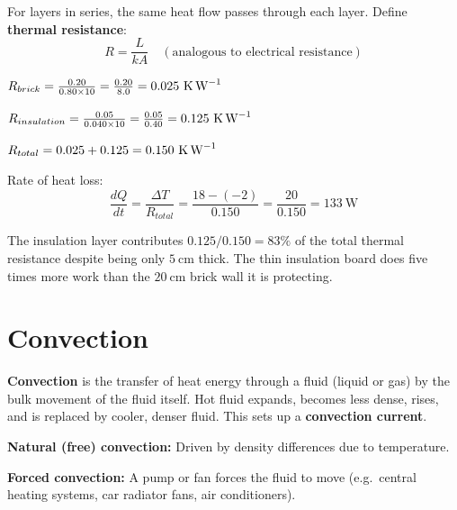 \begin{solutionbox}
For layers in series, the same heat flow passes
through each layer. Define \textbf{thermal resistance}:
\[
  R = \frac{L}{kA}
  \quad (\text{analogous to electrical resistance})
\]

$R_{brick} = \frac{0.20}{0.80 \times 10}
= \frac{0.20}{8.0} = 0.025\ \text{K\,W}^{-1}$

$R_{insulation} = \frac{0.05}{0.040 \times 10}
= \frac{0.05}{0.40} = 0.125\ \text{K\,W}^{-1}$

$R_{total} = 0.025 + 0.125 = 0.150\ \text{K\,W}^{-1}$

Rate of heat loss:
\[
  \frac{dQ}{dt} = \frac{\Delta T}{R_{total}}
  = \frac{18 - (-2)}{0.150}
  = \frac{20}{0.150}
  = 133\ \text{W}
\]

The insulation layer contributes $0.125/0.150
= 83\%$ of the total thermal resistance despite
being only $5\ \text{cm}$ thick. The thin insulation
board does five times more work than the $20\ \text{cm}$
brick wall it is protecting.
\end{solutionbox}

\section{Convection}

\begin{definitionbox}[Convection]
\textbf{Convection} is the transfer of heat energy
through a fluid (liquid or gas) by the bulk movement
of the fluid itself. Hot fluid expands, becomes less
dense, rises, and is replaced by cooler, denser fluid.
This sets up a \textbf{convection current}.

\textbf{Natural (free) convection:} Driven by density
differences due to temperature.

\textbf{Forced convection:} A pump or fan forces
the fluid to move (e.g.\ central heating systems,
car radiator fans, air conditioners).
\end{definitionbox}

